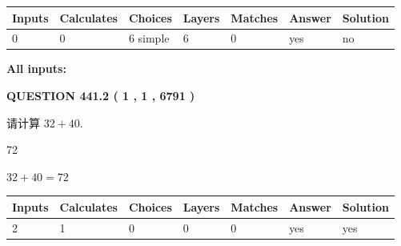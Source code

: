 \documentclass{ctexart}
\begin{document}
   
\noindent\begin{tabular}{|l|l|l|l|l|l|l|}
 \hline
Inputs & Calculates & Choices & Layers & Matches & Answer & Solution \\ \hline
 0  & 
 0  & 
 6
  simple  
  & 
 6  & 
 0  & 
  yes & 
  no 
  \\ \hline
 \end{tabular}
   
   
   
   
\noindent{}
   
   
   
   
\noindent\vspace{0.1in}\hspace{-0.08in} {\textbf{\Large{All inputs: }}}
   
   
  
\vspace{0.2in}
  
{\textbf{\Large{QUESTION
441.2 
 ( 1 , 1 , 6791 )
}}}
  
  
 
请计算 $ %
32 +  %
40 $.
 
 
 
\noindent{}
 
 

72
 
 
\noindent{}
 
 

 
 
 
\noindent{}
 
 

$ %
32 +  %
40=   %
72$
 
 
\noindent{}
 
 

 
   
   
   
   
\noindent\begin{tabular}{|l|l|l|l|l|l|l|}
 \hline
Inputs & Calculates & Choices & Layers & Matches & Answer & Solution \\ \hline
 2  & 
 1  & 
 0
  & 
 0  & 
 0  & 
  yes & 
  yes 
  \\ \hline
 \end{tabular}
   
\end{document}
